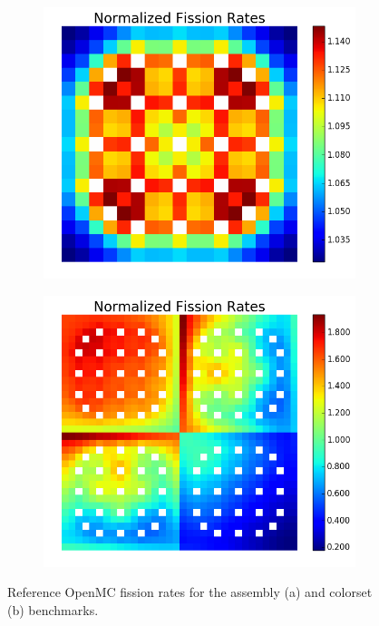 \begin{figure}[h!]
\centering
\begin{subfigure}{0.45\textwidth}
  \includegraphics[width=\linewidth]{figures/assembly/fission-rates}
  \caption{}
  \label{fig:fiss-assm}
\end{subfigure}%
\begin{subfigure}{0.45\textwidth}
  \includegraphics[width=\linewidth]{figures/colorset/fission-rates}
  \caption{}
  \label{fig:capt-assm}
\end{subfigure}
\caption{Reference OpenMC fission rates for the assembly (a) and colorset (b) benchmarks.}
\label{fig:benchmarks-fiss-rates}
\end{figure}


